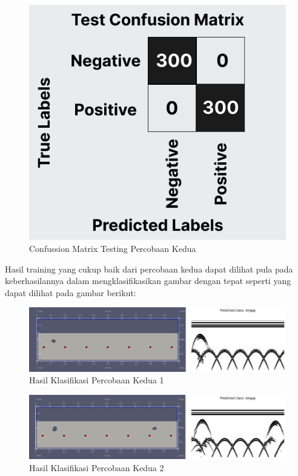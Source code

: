 \begin{figure} [H] \centering
    \includegraphics[scale=0.3]{gambar/bab4/testcon2.png}
    \caption{Confussion Matrix Testing Percobaan Kedua}
    \label{fig:testcon2}
\end{figure}

Hasil training yang cukup baik dari percobaan kedua dapat dilihat pula pada keberhasilannya dalam mengklasifikasikan gambar dengan tepat seperti yang dapat dilihat pada gambar berikut:

\begin{figure} [H] \centering
    \includegraphics[scale=0.2]{gambar/bab4/Airgap 19992.png}
    \caption{Hasil Klasifikasi Percobaan Kedua 1}
\end{figure}

\begin{figure} [H] \centering
    \includegraphics[scale=0.2]{gambar/bab4/Airgap 20002.png}
    \caption{Hasil Klasifikasi Percobaan Kedua 2}
\end{figure}

